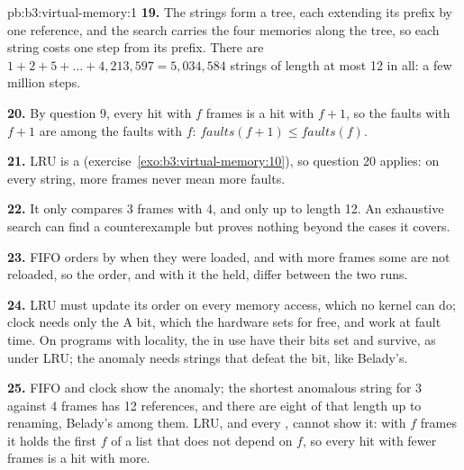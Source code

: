 \begin{solution}{pb:b3:virtual-memory:1}
\textbf{19.} The strings form a tree, each extending its prefix by one reference, and the search carries the four memories along the tree, so each string costs one step from its prefix. There are $1 + 2 + 5 + \dots + 4{,}213{,}597 = 5{,}034{,}584$ strings of length at most 12 in all: a few million steps.

\textbf{20.} By question 9, every hit with $f$ frames is a hit with $f + 1$, so the faults with $f + 1$ are among the faults with $f$: $\mathit{faults}(f + 1) \le \mathit{faults}(f)$.

\textbf{21.} LRU is a  (exercise~\ref{exo:b3:virtual-memory:10}), so question 20 applies: on every string, more frames never mean more faults.

\textbf{22.} It only compares 3 frames with 4, and only up to length 12. An exhaustive search can find a counterexample but proves nothing beyond the cases it covers.

\textbf{23.} FIFO orders  by when they were loaded, and with more frames some  are not reloaded, so the order, and with it the  held, differ between the two runs.

\textbf{24.} LRU must update its order on every memory access, which no kernel can do; clock needs only the A bit, which the hardware sets for free, and work at fault time. On programs with locality, the  in use have their bits set and survive, as under LRU; the anomaly needs strings that defeat the bit, like Belady's.

\textbf{25.} FIFO and clock show the anomaly; the shortest anomalous string for 3 against 4 frames has 12 references, and there are eight of that length up to renaming, Belady's among them. LRU, and every , cannot show it: with $f$ frames it holds the first $f$  of a list that does not depend on $f$, so every hit with fewer frames is a hit with more.
\end{solution}
